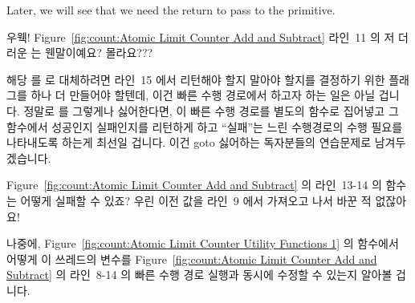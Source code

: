 \begin{enumerate}
	Later, we will see that we need the  return to pass
	to the  primitive.
	\fi

\QuickQ{}
	우웩!
	Figure~\ref{fig:count:Atomic Limit Counter Add and Subtract} 라인~11 의
	저 더러운  는 웬말이예요?
	 몰라요???

\QuickA{}
	해당  를  로 대체하려면 라인~15 에서 리턴해야 할지
	말아야 할지를 결정하기 위한 플래그를 하나 더 만들어야 할텐데, 이건 빠른
	수행 경로에서 하고자 하는 일은 아닐 겁니다.
	정말로  를 그렇게나 싫어한다면, 이 빠른 수행 경로를 별도의
	함수로 집어넣고 그 함수에서 성공인지 실패인지를 리턴하게 하고
	``실패''는 느린 수행경로의 수행 필요를 나타내도록 하는게 최선일 겁니다.
	이건 goto 싫어하는 독자분들의 연습문제로 남겨두겠습니다.

\QuickQ{}
	Figure~\ref{fig:count:Atomic Limit Counter Add and Subtract} 의
	라인~13-14 의  함수는 어떻게 실패할 수 있죠?
	우린 이전 값을 라인~9 에서 가져오고 나서 바꾼 적 없잖아요!

\QuickA{}
	나중에, Figure~\ref{fig:count:Atomic Limit Counter Utility Functions 1}
	의  함수에서 어떻게 이 쓰레드의 
	변수를 Figure~\ref{fig:count:Atomic Limit Counter Add and Subtract} 의
	라인~8-14 의 빠른 수행 경로 실행과 동시에 수정할 수 있는지 알아볼
	겁니다.

\end{enumerate}
